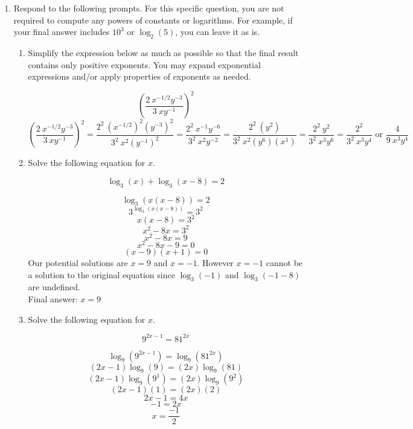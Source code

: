 \documentclass[11pt]{article}
\begin{document}
\begin{enumerate}
\item Respond to the following prompts. For this specific question, you are not required to compute any powers of constants or logarithms. For example, if your final answer includes $10^3$ or $\log_2(5)$, you can leave it as is.

\begin{enumerate}
    \item Simplify the expression below as much as possible so that the final result contains only positive exponents. You may expand exponential expressions and/or apply properties of exponents as needed. 

    \[\left(\dfrac{2 \ x^{-1/2}y^{-3}}{3\ xy^{-1}}\right)^2\]
    {\color{blue}\[\left(\dfrac{2 \ x^{-1/2}y^{-3}}{3\ xy^{-1}}\right)^2=\dfrac{2^2 \ (x^{-1/2})^2(y^{-3})^2}{3^2\ x^2(y^{-1})^2}=\dfrac{2^2 \ x^{-1}y^{-6}}{3^2\ x^2y^{-2}}=\dfrac{2^2 \ (y^{2})}{3^2\ x^2(y^{6})(x^1)}=\dfrac{2^2 \ y^2}{3^2\ x^3y^6}=\dfrac{2^2}{3^2\ x^3y^4}\text{ or }\dfrac{4}{9\ x^3y^4}\]}
    
    \vfill

    \item Solve the following equation for $x$. 

    \[\log_{3}(x) + \log_{3}(x - 8) = 2\]

    {\color{blue}\[\log_{3}\left(x(x-8)\right)=2\]
    \[3^{\log_{3}(x(x-8))}=3^2\]
    \[x(x-8)=3^2\]
    \[x^2-8x=3^2\]
    \[x^2-8x=9\]
    \[x^2-8x-9=0\]
    \[(x-9)(x+1)=0\]
    Our potential solutions are $x=9$ and $x=-1$. However $x=-1$ cannot be a solution to the original equation since $\log_{3}(-1)$ and $\log_{3}(-1-8)$ are undefined.\\
    Final answer: $x=9$}

    \vfill
     \item Solve the following equation for $x$. 

    \[9^{2x - 1} = 81^{2x}\]


    {\color{blue}\begin{center}
        \[\log_{9}(9^{2x-1})=\log_{9}(81^{2x})\]
        \[(2x-1)\log_{9}(9)=(2x)\log_{9}(81)\]
        \[(2x-1)\log_{9}(9^1)=(2x)\log_{9}(9^2)\]
        \[(2x-1)(1)=(2x)(2)\]
        \[2x-1=4x\]
        \[-1=2x\]
        \[x=\frac{-1}{2}\]
    \end{center}}

    \vfill
\end{enumerate}




\end{enumerate}
\end{document}
